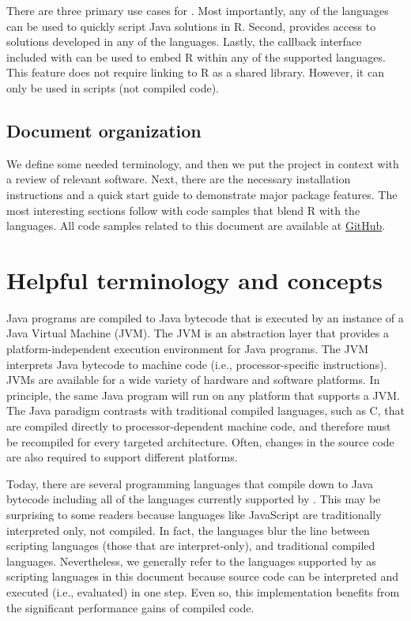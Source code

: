 There are three primary use cases for . Most importantly, any of the  languages can be used to quickly script Java solutions in R. Second,  provides access to solutions developed in any of the  languages. Lastly, the callback interface included with  can be used to embed R within any of the supported languages. This feature does not require linking to R as a shared library. However, it can only be used in scripts (not compiled code).

\subsection{Document organization}

We define some needed terminology, and then we put the  project in context with a review of relevant software. Next, there are the necessary installation instructions and a quick start guide to demonstrate major package features. The most interesting sections follow with code samples that blend R with the  languages. All code samples related to this document are available at \href{http://notavalidaddresss////}{GitHub}.

\section{Helpful terminology and concepts}

Java programs are compiled to Java bytecode that is executed by an instance of a Java Virtual Machine (JVM). The JVM is an abstraction layer that provides a platform-independent execution environment for Java programs. The JVM interprets Java bytecode to machine code (i.e., processor-specific instructions). JVMs are available for a wide variety of hardware and software platforms. In principle, the same Java program will run on any platform that supports a JVM. The Java paradigm contrasts with traditional compiled languages, such as C, that are compiled directly to processor-dependent machine code, and therefore must be recompiled for every targeted architecture. Often, changes in the source code are also required to support different platforms.

Today, there are several programming languages that compile down to Java bytecode including all of the languages currently supported by . This may be surprising to some readers because languages like JavaScript are traditionally interpreted only, not compiled. In fact, the  languages blur the line between scripting languages (those that are interpret-only), and traditional compiled languages. Nevertheless, we generally refer to the languages supported by  as scripting languages in this document because source code can be interpreted and executed (i.e., evaluated) in one step. Even so, this implementation benefits from the significant performance gains of compiled code.

